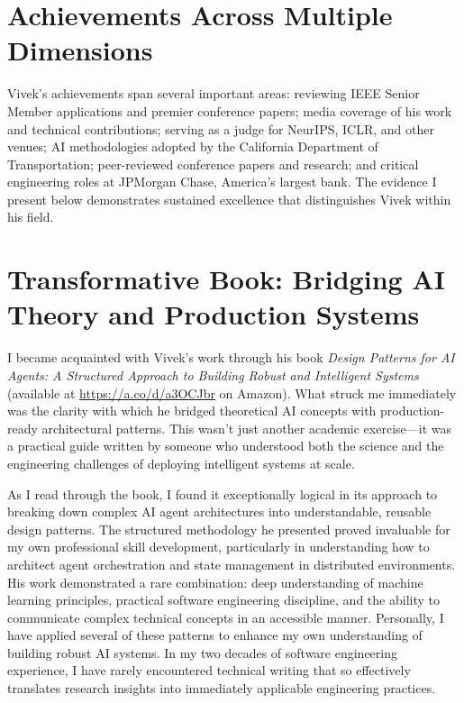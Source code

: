 \documentclass[11pt]{article}
\begin{document}
\section*{Achievements Across Multiple Dimensions}

Vivek's achievements span several important areas: reviewing IEEE Senior Member applications and premier conference papers; media coverage of his work and technical contributions; serving as a judge for NeurIPS, ICLR, and other venues; AI methodologies adopted by the California Department of Transportation; peer-reviewed conference papers and research; and critical engineering roles at JPMorgan Chase, America's largest bank. The evidence I present below demonstrates sustained excellence that distinguishes Vivek within his field.

\section*{Transformative Book: Bridging AI Theory and Production Systems}

I became acquainted with Vivek's work through his book \textit{Design Patterns for AI Agents: A Structured Approach to Building Robust and Intelligent Systems} (available at \url{https://a.co/d/a3OCJbr} on Amazon). What struck me immediately was the clarity with which he bridged theoretical AI concepts with production-ready architectural patterns. This wasn't just another academic exercise---it was a practical guide written by someone who understood both the science and the engineering challenges of deploying intelligent systems at scale.

As I read through the book, I found it exceptionally logical in its approach to breaking down complex AI agent architectures into understandable, reusable design patterns. The structured methodology he presented proved invaluable for my own professional skill development, particularly in understanding how to architect agent orchestration and state management in distributed environments. His work demonstrated a rare combination: deep understanding of machine learning principles, practical software engineering discipline, and the ability to communicate complex technical concepts in an accessible manner. Personally, I have applied several of these patterns to enhance my own understanding of building robust AI systems. In my two decades of software engineering experience, I have rarely encountered technical writing that so effectively translates research insights into immediately applicable engineering practices.
\end{document}

